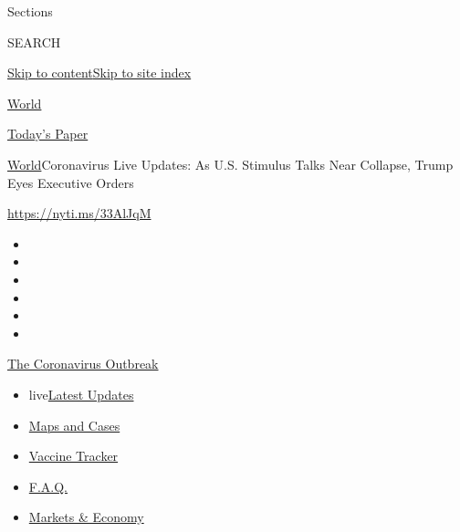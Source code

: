 Sections

SEARCH

\protect\hyperlink{site-content}{Skip to
content}\protect\hyperlink{site-index}{Skip to site index}

\href{https://www.nytimes3xbfgragh.onion/section/world}{World}

\href{https://myaccount.nytimes3xbfgragh.onion/auth/login?response_type=cookie\&client_id=vi}{}

\href{https://www.nytimes3xbfgragh.onion/section/todayspaper}{Today's
Paper}

\href{/section/world}{World}\textbar{}Coronavirus Live Updates: As U.S.
Stimulus Talks Near Collapse, Trump Eyes Executive Orders

\href{https://nyti.ms/33AlJqM}{https://nyti.ms/33AlJqM}

\begin{itemize}
\item
\item
\item
\item
\item
\item
\end{itemize}

\href{https://www.nytimes3xbfgragh.onion/news-event/coronavirus?action=click\&pgtype=Article\&state=default\&region=TOP_BANNER\&context=storylines_menu}{The
Coronavirus Outbreak}

\begin{itemize}
\tightlist
\item
  live\href{https://www.nytimes3xbfgragh.onion/2020/08/07/world/covid-19-news.html?action=click\&pgtype=Article\&state=default\&region=TOP_BANNER\&context=storylines_menu}{Latest
  Updates}
\item
  \href{https://www.nytimes3xbfgragh.onion/interactive/2020/us/coronavirus-us-cases.html?action=click\&pgtype=Article\&state=default\&region=TOP_BANNER\&context=storylines_menu}{Maps
  and Cases}
\item
  \href{https://www.nytimes3xbfgragh.onion/interactive/2020/science/coronavirus-vaccine-tracker.html?action=click\&pgtype=Article\&state=default\&region=TOP_BANNER\&context=storylines_menu}{Vaccine
  Tracker}
\item
  \href{https://www.nytimes3xbfgragh.onion/interactive/2020/world/coronavirus-tips-advice.html?action=click\&pgtype=Article\&state=default\&region=TOP_BANNER\&context=storylines_menu}{F.A.Q.}
\item
  \href{https://www.nytimes3xbfgragh.onion/live/2020/08/07/business/stock-market-today-coronavirus?action=click\&pgtype=Article\&state=default\&region=TOP_BANNER\&context=storylines_menu}{Markets
  \& Economy}
\end{itemize}

